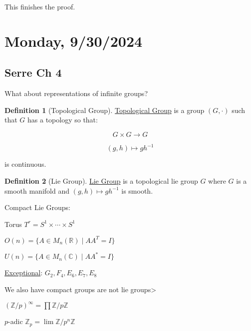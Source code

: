 \documentclass{article}
\theoremstyle{definition}
\newtheorem*{definition}{Definition}
\begin{document}
This finishes the proof.


\section*{Monday, 9/30/2024}

\subsection*{Serre Ch 4}

What about representations of infinite groups?


\begin{definition}
    [Topological Group] \underline{Topological Group} is a group \((G,\cdot)\) such that \(G\) has a topology so that:

    \[
        G \times G \to G
    \]

    \[
        (g,h) \mapsto g h ^{-1} 
    \]

    is continuous.
\end{definition}

\begin{definition}
    [Lie Group] \underline{Lie Group} is a topological lie group \(G\) where \(G\) is a smooth manifold and \((g,h) \mapsto g h ^{-1} \) is smooth.
\end{definition}

Compact Lie Groups:

Torus \(T^r = S^1 \times \cdots \times S^1\)

\(O(n) = \{ A \in M_n(\mathbb{R}) \mid A A^T = I \} \) 

\(U(n) = \{ A \in M_n(\mathbb{C}) \mid A A^{\ast} = I \}\) 

\underline{Exceptional}: \(G_2, F_4, E_6, E_7, E_8\) 

We also have compact groups are not lie groups>

\((\mathbb{Z} / p)^{\infty} = \prod \mathbb{Z} / p \mathbb{Z}\) 

\(p\)-adic \(\mathbb{Z}_p = \lim \mathbb{Z} / p^n \mathbb{Z}\) 
\end{document}

